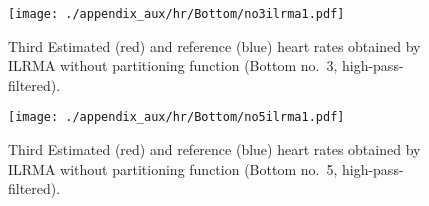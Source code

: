 \begin{figure}[tb]
\centering
\texttt{[image: ./appendix\_aux/hr/Bottom/no3ilrma1.pdf]}
\caption{Third Estimated (red) and reference (blue) heart rates obtained by ILRMA without partitioning function (Bottom no.~3, high-pass-filtered).}
\end{figure}

\begin{figure}[tb]
\centering
\texttt{[image: ./appendix\_aux/hr/Bottom/no5ilrma1.pdf]}
\caption{Third Estimated (red) and reference (blue) heart rates obtained by ILRMA without partitioning function (Bottom no.~5, high-pass-filtered).}
\label{fig:appendixf}
\end{figure}
